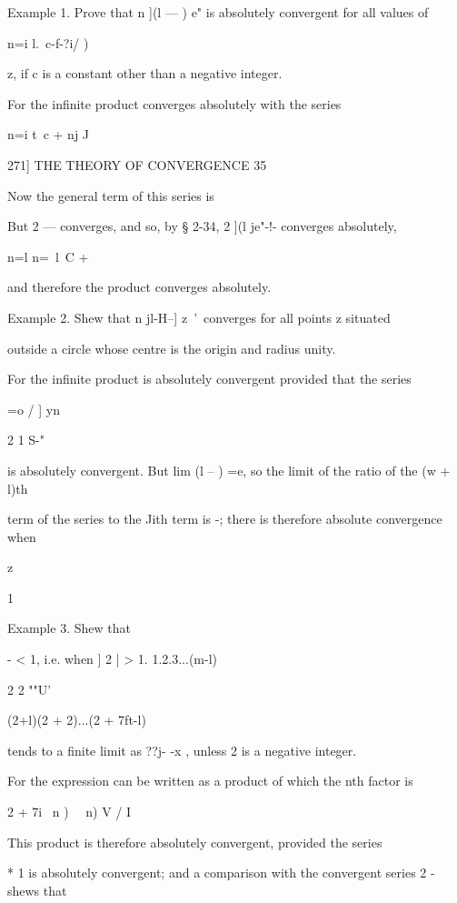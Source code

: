 Example 1. Prove that n ](l — ) e" is absolutely convergent for all
values of

n=i l.\ c-f-?i/ )

z, if c is a constant other than a negative integer.

For the infinite product converges absolutely with the series

n=i t\ c + nj J



271] THE THEORY OF CONVERGENCE 35

Now the general term of this series is

But 2 — converges, and so, by § 2-34, 2 ](l je"-!- converges
absolutely,

n=l n=\ l\ C + %

and therefore the product converges absolutely.

Example 2. Shew that n jl-H--] z~'\ converges for all points z
situated

outside a circle whose centre is the origin and radius unity.

For the infinite product is absolutely convergent provided that the
series

=o / ] yn

2 1 S-"

is absolutely convergent. But lim (l -- ) =e, so the limit of the
ratio of the (w + l)th

term of the series to the Jith term is -; there is therefore absolute
convergence when

z

1



Example 3. Shew that



- < 1, i.e. when ] 2 | > 1. 1.2.3...(m-l)



2 2 ""U'



(2+l)(2 + 2)...(2 + 7ft-l)

tends to a finite limit as ??j- -x , unless 2 is a negative integer.

For the expression can be written as a product of which the nth factor
is

2 + 7i \ n ) ~\ n) V / I

This product is therefore absolutely convergent, provided the series

* 1 is absolutely convergent; and a comparison with the convergent
series 2 - shews that

